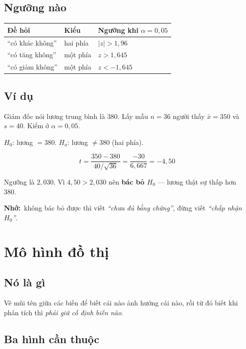 \documentclass[12pt]{article}
\newcommand{\nho}{\textbf{Nhớ:}\ }
\begin{document}
\subsection*{Ngưỡng nào}

\begin{center}
\begin{tabular}{@{}lll@{}}
\toprule
\textbf{Đề hỏi} & \textbf{Kiểu} & \textbf{Ngưỡng khi } $\alpha = 0{,}05$ \\
\midrule
``có khác không'' & hai phía & $|z| > 1{,}96$ \\
``có tăng không'' & một phía & $z > 1{,}645$ \\
``có giảm không'' & một phía & $z < -1{,}645$ \\
\bottomrule
\end{tabular}
\end{center}

\subsection*{Ví dụ}

Giám đốc nói lương trung bình là 380. Lấy mẫu $n = 36$ người thấy $\bar x = 350$ và
$s = 40$. Kiểm ở $\alpha = 0{,}05$.

$H_0$: lương $= 380$. \quad $H_a$: lương $\neq 380$ (hai phía).

\[
t = \frac{350 - 380}{40/\sqrt{36}} = \frac{-30}{6{,}667} = -4{,}50
\]

Ngưỡng là $2{,}030$. Vì $4{,}50 > 2{,}030$ nên \textbf{bác bỏ $H_0$} --- lương thật
sự thấp hơn 380.

\nho không bác bỏ được thì viết \emph{``chưa đủ bằng chứng''}, đừng viết
\emph{``chấp nhận $H_0$''}.

\section{Mô hình đồ thị}

\subsection*{Nó là gì}

Vẽ mũi tên giữa các biến để biết cái nào ảnh hưởng cái nào, rồi từ đó biết khi
phân tích thì \emph{phải giữ cố định biến nào}.

\subsection*{Ba hình cần thuộc}
\end{document}
